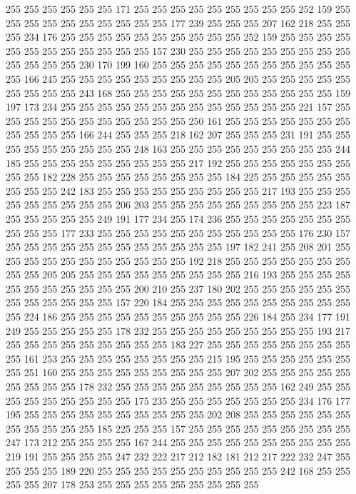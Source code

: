 255 255 255 255 255 255 171 255 255 255 255 255 255 255 255 255 252 159 255 255
255 255 255 255 255 255 255 255 177 239 255 255 255 207 162 218 255 255 255 234
176 255 255 255 255 255 255 255 255 255 255 252 159 255 255 255 255 255 255 255
255 255 255 255 255 157 230 255 255 255 255 255 255 255 255 255 255 255 255 255
230 170 199 160 255 255 255 255 255 255 255 255 255 255 255 255 166 245 255 255
255 255 255 255 255 255 255 205 205 255 255 255 255 255 255 255 255 255 243 168
255 255 255 255 255 255 255 255 255 255 255 255 159 197 173 234 255 255 255 255
255 255 255 255 255 255 255 255 255 221 157 255 255 255 255 255 255 255 255 255
255 255 250 161 255 255 255 255 255 255 255 255 255 255 255 166 244 255 255 255
218 162 207 255 255 255 231 191 255 255 255 255 255 255 255 255 255 248 163 255
255 255 255 255 255 255 255 255 244 185 255 255 255 255 255 255 255 255 255 217
192 255 255 255 255 255 255 255 255 255 182 228 255 255 255 255 255 255 255 255
184 225 255 255 255 255 255 255 255 255 242 183 255 255 255 255 255 255 255 255
255 217 193 255 255 255 255 255 255 255 255 255 206 203 255 255 255 255 255 255
255 255 255 223 187 255 255 255 255 255 249 191 177 234 255 174 236 255 255 255
255 255 255 255 255 255 255 177 233 255 255 255 255 255 255 255 255 255 255 255
176 230 157 255 255 255 255 255 255 255 255 255 255 255 255 197 182 241 255 208
201 255 255 255 255 255 255 255 255 255 255 255 192 218 255 255 255 255 255 255
255 255 255 205 205 255 255 255 255 255 255 255 255 255 216 193 255 255 255 255
255 255 255 255 255 255 255 200 210 255 237 180 202 255 255 255 255 255 255 255
255 255 255 255 255 157 220 184 255 255 255 255 255 255 255 255 255 255 255 224
186 255 255 255 255 255 255 255 255 255 255 226 184 255 234 177 191 249 255 255
255 255 255 178 232 255 255 255 255 255 255 255 255 255 193 217 255 255 255 255
255 255 255 255 255 183 227 255 255 255 255 255 255 255 255 255 161 253 255 255
255 255 255 255 255 255 215 195 255 255 255 255 255 255 255 251 160 255 255 255
255 255 255 255 255 255 207 202 255 255 255 255 255 255 255 255 255 178 232 255
255 255 255 255 255 255 255 255 162 249 255 255 255 255 255 255 255 255 255 175
235 255 255 255 255 255 255 255 234 176 177 195 255 255 255 255 255 255 255 255
255 255 202 208 255 255 255 255 255 255 255 255 255 255 255 185 225 255 255 157
255 255 255 255 255 255 255 255 255 247 173 212 255 255 255 255 167 244 255 255
255 255 255 255 255 255 255 255 219 191 255 255 255 255 247 232 222 217 212 182
181 212 217 222 232 247 255 255 255 255 189 220 255 255 255 255 255 255 255 255
255 255 242 168 255 255 255 255 207 178 253 255 255 255 255 255 255 255 255 255
